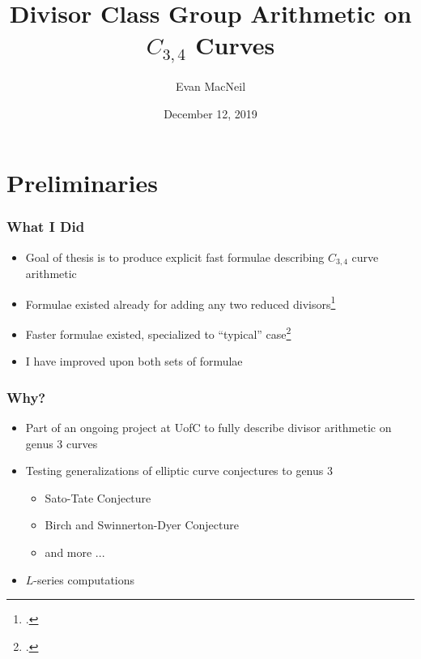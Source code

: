 \documentclass{beamer}
\title[$C_{3,4}$ Arithmetic]{Divisor Class Group Arithmetic on $C_{3,4}$ Curves} %
\author{Evan MacNeil} %
\institute[UofC] %
{
University of Calgary \\ %
\medskip
\textit{macneil.evan@ucalgary.ca} %
}
\date{December 12, 2019} %
\begin{document}
\begin{frame}
\titlepage %
\end{frame}



\section{Preliminaries} 

\begin{frame}
\frametitle{What I Did}
  \begin{itemize}
    \item Goal of thesis is to produce explicit fast formulae describing $C_{3,4}$ curve arithmetic
    \item Formulae existed already for adding any two reduced divisors\footcite{arita05-2}
    \item Faster formulae existed, specialized to ``typical'' case\footcite{salem07,kamal18}
    \item I have improved upon both sets of formulae
  \end{itemize}
\end{frame}


\begin{frame}
\frametitle{Why?}
  \begin{itemize}
    \item Part of an ongoing project at UofC to fully describe divisor arithmetic on genus 3 curves
    \item Testing generalizations of elliptic curve conjectures to genus 3
    \begin{itemize}
      \item Sato-Tate Conjecture
      \item Birch and Swinnerton-Dyer Conjecture
      \item and more ...
    \end{itemize}
    \item $L$-series computations
  \end{itemize}
\end{frame}
\end{document}
